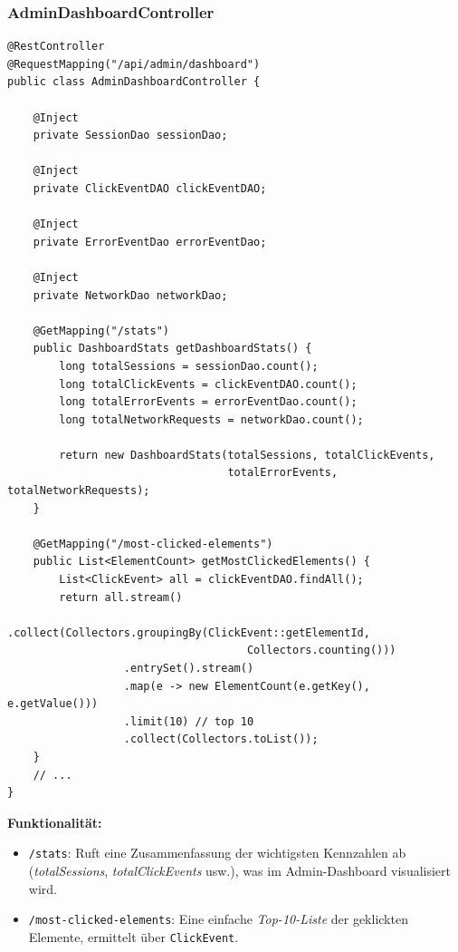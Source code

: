 \documentclass[12pt,oneside]{article}
\begin{document}
\subsubsection{AdminDashboardController}
\lstset{style=java}
\begin{lstlisting}
@RestController
@RequestMapping("/api/admin/dashboard")
public class AdminDashboardController {

    @Inject
    private SessionDao sessionDao;

    @Inject
    private ClickEventDAO clickEventDAO;

    @Inject
    private ErrorEventDao errorEventDao;

    @Inject
    private NetworkDao networkDao;

    @GetMapping("/stats")
    public DashboardStats getDashboardStats() {
        long totalSessions = sessionDao.count();
        long totalClickEvents = clickEventDAO.count();
        long totalErrorEvents = errorEventDao.count();
        long totalNetworkRequests = networkDao.count();

        return new DashboardStats(totalSessions, totalClickEvents, 
                                  totalErrorEvents, totalNetworkRequests);
    }

    @GetMapping("/most-clicked-elements")
    public List<ElementCount> getMostClickedElements() {
        List<ClickEvent> all = clickEventDAO.findAll();
        return all.stream()
                  .collect(Collectors.groupingBy(ClickEvent::getElementId,
                                     Collectors.counting()))
                  .entrySet().stream()
                  .map(e -> new ElementCount(e.getKey(), e.getValue()))
                  .limit(10) // top 10
                  .collect(Collectors.toList());
    }
    // ...
}
\end{lstlisting}

\noindent
\textbf{Funktionalität:}
\begin{itemize}
    \item \lstinline|/stats|: Ruft eine Zusammenfassung der wichtigsten Kennzahlen ab (\emph{totalSessions}, \emph{totalClickEvents} usw.), was im Admin-Dashboard visualisiert wird.
    \item \lstinline|/most-clicked-elements|: Eine einfache \emph{Top-10-Liste} der geklickten Elemente, ermittelt über \lstinline|ClickEvent|.
\end{itemize}
\end{document}
